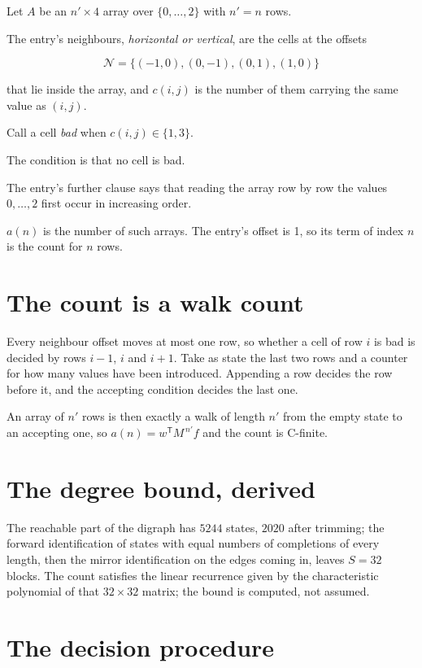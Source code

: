 \documentclass[11pt]{article}
\theoremstyle{definition}
\begin{document}
Let $A$ be an $n' \times 4$ array over $\{0,\dots,2\}$ with $n' = n$ rows.

The entry's neighbours, {\itshape horizontal or vertical}, are the cells at the offsets

\[\mathcal{N} = \{(-1,0), (0,-1), (0,1), (1,0)\}\]

that lie inside the array, and $c(i,j)$ is the number of them carrying the same value as $(i,j)$.

Call a cell {\itshape bad} when $c(i,j) \in \{1, 3\}$.

The condition is that no cell is bad.

The entry's further clause says that reading the array row by row the values $0,\dots,2$ first occur in increasing order.

$a(n)$ is the number of such arrays. The entry's offset is 1, so its term of index $n$ is the count for $n$ rows.

\section{The count is a walk count}

Every neighbour offset moves at most one row, so whether a cell of row $i$ is bad is decided by rows $i-1$, $i$ and $i+1$. Take as state the last two rows and a counter for how many values have been introduced. Appending a row decides the row before it, and the accepting condition decides the last one.

An array of $n'$ rows is then exactly a walk of length $n'$ from the empty state to an accepting one, so $a(n) = w^{\mathsf T}M^{\,n'}f$ and the count is C-finite.

\section{The degree bound, derived}

The reachable part of the digraph has $5244$ states, $2020$ after trimming; the forward identification of states with equal numbers of completions of every length, then the mirror identification on the edges coming in, leaves $S = 32$ blocks. The count satisfies the linear recurrence given by the characteristic polynomial of that $32\times32$ matrix; the bound is computed, not assumed.

\section{The decision procedure}
\end{document}
